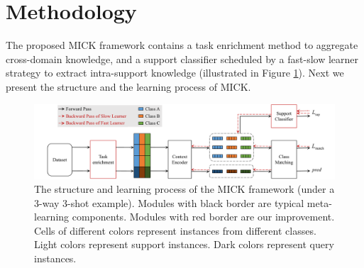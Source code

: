 \section{Methodology}
The proposed MICK framework contains a task enrichment method to
aggregate cross-domain knowledge, and a support classifier scheduled by
a fast-slow learner strategy to extract intra-support knowledge (illustrated in Figure \ref{fig:model}).
Next we present the structure and the learning process of MICK.


\label{sec:Methodology}
\begin{figure}[ht]
    \centering
    \includegraphics[width=17cm]{model.pdf}
    \caption{The structure and learning process of the MICK framework (under a 3-way 3-shot example). Modules with black border are typical meta-learning components. Modules with red border are our improvement. Cells of different colors represent instances from different classes. Light colors represent support instances. Dark colors represent query instances.
    }
    \label{fig:model}
\end{figure}


